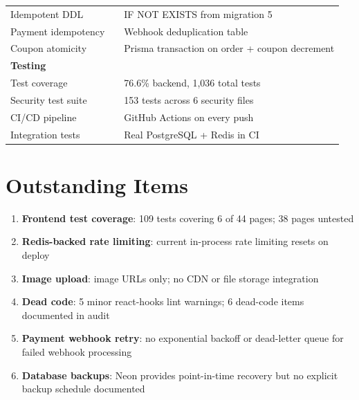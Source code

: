 \documentclass[11pt,a4paper,twoside]{book}
\newcommand{\yes}{\textcolor{ok}{\faCheckCircle}}
\begin{document}
\begin{center}
\begin{tabular}{p{5.5cm}lp{6cm}}
\rowcolor{rowalt}Idempotent DDL        & \yes{} & IF NOT EXISTS from migration 5 \\
Payment idempotency   & \yes{} & Webhook deduplication table \\
\rowcolor{rowalt}Coupon atomicity      & \yes{} & Prisma transaction on order + coupon decrement \\
\midrule
\multicolumn{3}{l}{\textbf{Testing}} \\
\midrule
Test coverage         & \yes{} & 76.6\% backend, 1,036 total tests \\
\rowcolor{rowalt}Security test suite   & \yes{} & 153 tests across 6 security files \\
CI/CD pipeline        & \yes{} & GitHub Actions on every push \\
\rowcolor{rowalt}Integration tests     & \yes{} & Real PostgreSQL + Redis in CI \\
\bottomrule
\end{tabular}
\end{center}

\section{Outstanding Items}

\begin{tcolorbox}[warn,title=Known Gaps (Non-Blocking)]
\begin{enumerate}[leftmargin=1.4em,nosep]
  \item \textbf{Frontend test coverage}: 109 tests covering 6 of 44 pages; 38 pages untested
  \item \textbf{Redis-backed rate limiting}: current in-process rate limiting resets on deploy
  \item \textbf{Image upload}: image URLs only; no CDN or file storage integration
  \item \textbf{Dead code}: 5 minor react-hooks lint warnings; 6 dead-code items documented in audit
  \item \textbf{Payment webhook retry}: no exponential backoff or dead-letter queue for failed webhook processing
  \item \textbf{Database backups}: Neon provides point-in-time recovery but no explicit backup schedule documented
\end{enumerate}
\end{tcolorbox}

\end{document}
